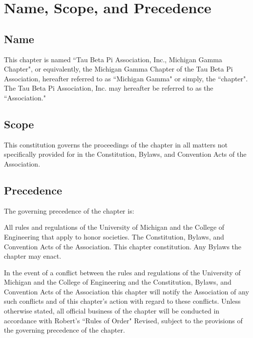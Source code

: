 \chapter{Name, Scope, and Precedence}

\section{Name}
This chapter is named ``Tau Beta Pi Association, Inc., Michigan Gamma Chapter", or equivalently, the Michigan Gamma Chapter of the Tau Beta Pi Association, hereafter referred to as ``Michigan Gamma" or simply, the ``chapter".
The Tau Beta Pi Association, Inc. may hereafter be referred to as the ``Association."

\section{Scope}
This constitution governs the proceedings of the chapter in all matters not specifically provided for in the Constitution, Bylaws, and Convention Acts of the Association.
\section{Precedence}
The governing precedence of the chapter is:

\begin{tight_enumerate}

\itemnotoc All rules and regulations of the University of Michigan and the College of Engineering that apply to honor societies.
\itemnotoc The Constitution, Bylaws, and Convention Acts of the Association.
\itemnotoc This chapter constitution.
\itemnotoc Any Bylaws the chapter may enact.

\end{tight_enumerate}

In the event of a conflict between the rules and regulations of the University of Michigan and the College of Engineering and the Constitution, Bylaws, and Convention Acts of the Association this chapter will notify the Association of any such conflicts and of this chapter's action with regard to these conflicts.
Unless otherwise stated, all official business of the chapter will be conducted in accordance with Robert's ``Rules of Order" Revised, subject to the provisions of the governing precedence of the chapter.

